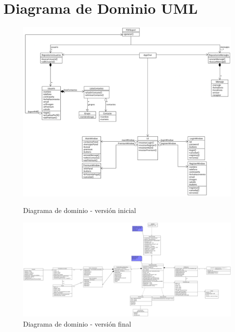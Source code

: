 \newpage
{}
\section*{Diagrama de Dominio UML}

\begin{figure}[H]
    \centering
    \begin{minipage}{0.85\textwidth}
        \centering
        \includegraphics[width=\textwidth]{images/AppChat_Dominio_Inicial.png}
        \caption*{Diagrama de dominio - versión inicial}
    \end{minipage}
    
    \vspace{1.5em}

    \begin{minipage}{0.85\textwidth}
        \centering
        \includegraphics[width=\textwidth]{images/AppChat_Dominio.png}
        \caption*{Diagrama de dominio - versión final}
    \end{minipage}
\end{figure}
\newpage
